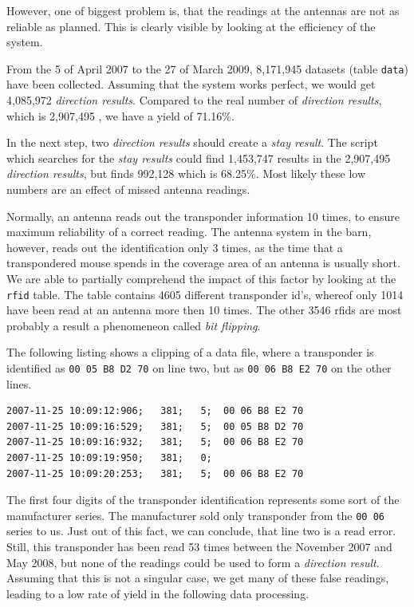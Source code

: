 However, one of biggest problem is, that the readings at the antennas are not as reliable as planned. This is clearly visible by looking at the efficiency of the system.

From the 5 of April 2007 to the 27 of March 2009, 8,171,945 datasets (table \lstinline|data|) have been collected. Assuming that the system works perfect, we would get 4,085,972 \textit{direction results}. Compared to the real number of \textit{direction results}, which is 2,907,495 , we have a yield of 71.16\%.

In the next step, two \textit{direction results} should create a \textit{stay result}. The script which searches for the \textit{stay results} could find 1,453,747 results in the 2,907,495 \textit{direction results}, but finds 992,128 which is 68.25\%. Most likely these low numbers are an effect of missed antenna readings.

Normally, an antenna reads out the transponder information 10 times, to ensure maximum reliability of a correct reading. The antenna system in the barn, however, reads out the identification only 3 times, as the time that a transpondered mouse spends in the coverage area of an antenna is usually short. We are able to partially comprehend the impact of this factor by looking at the \lstinline|rfid| table. The table contains 4605 different transponder id's, whereof only 1014 have been read at an antenna more then 10 times. The other 3546 rfids are most probably a result a phenomeneon called \textit{bit flipping}.

The following listing shows a clipping of a data file, where a transponder is identified as \lstinline|00 05 B8 D2 70| on line two, but as \lstinline|00 06 B8 E2 70| on the other lines. 

\numcodestyle
{}
\begin{lstlisting}[frame=none]
2007-11-25 10:09:12:906;   381;   5;  00 06 B8 E2 70
2007-11-25 10:09:16:529;   381;   5;  00 05 B8 D2 70
2007-11-25 10:09:16:932;   381;   5;  00 06 B8 E2 70
2007-11-25 10:09:19:950;   381;   0; 
2007-11-25 10:09:20:253;   381;   5;  00 06 B8 E2 70
\end{lstlisting}

The first four digits of the transponder identification represents some sort of the manufacturer series. The manufacturer sold only transponder from the \lstinline|00 06| series to us. Just out of this fact, we can conclude, that line two is a read error. Still, this transponder has been read 53 times between the November 2007 and May 2008, but none of the readings could be used to form a \textit{direction result}. Assuming that this is not a singular case, we get many of these false readings, leading to a low rate of yield in the following data processing. 

